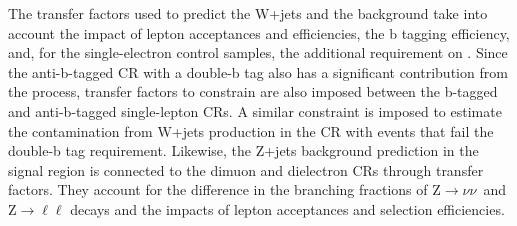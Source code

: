 The transfer factors used to predict the W+jets and the \ttbar background take into account the impact of lepton acceptances and efficiencies, the b tagging efficiency, and, for the single-electron control samples, the additional requirement on \MET.
Since the anti-b-tagged CR with a double-b tag also has a significant contribution from the \ttbar process,  transfer factors to constrain \ttbar are also imposed between the b-tagged and anti-b-tagged single-lepton CRs.
A similar constraint is imposed to estimate the contamination from W+jets production in the \ttbar CR with events that fail the double-b tag requirement. 
Likewise, the Z+jets background prediction in the signal region is connected to the dimuon and dielectron CRs through transfer factors.
They account for the difference in the branching fractions of $\mathrm{Z}\rightarrow \nu\nu$~and $\mathrm{Z}\rightarrow \ell\ell$ decays and the impacts of lepton acceptances and selection efficiencies.

